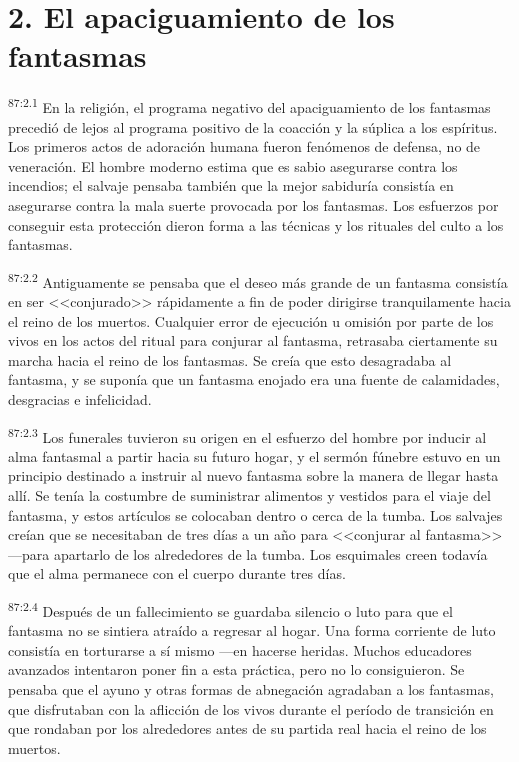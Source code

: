 \section*{2. El apaciguamiento de los fantasmas}
\par
\textsuperscript{87:2.1} En la religión, el programa negativo del apaciguamiento de los fantasmas precedió de lejos al programa positivo de la coacción y la súplica a los espíritus. Los primeros actos de adoración humana fueron fenómenos de defensa, no de veneración. El hombre moderno estima que es sabio asegurarse contra los incendios; el salvaje pensaba también que la mejor sabiduría consistía en asegurarse contra la mala suerte provocada por los fantasmas. Los esfuerzos por conseguir esta protección dieron forma a las técnicas y los rituales del culto a los fantasmas.

\par
\textsuperscript{87:2.2} Antiguamente se pensaba que el deseo más grande de un fantasma consistía en ser <<conjurado>> rápidamente a fin de poder dirigirse tranquilamente hacia el reino de los muertos. Cualquier error de ejecución u omisión por parte de los vivos en los actos del ritual para conjurar al fantasma, retrasaba ciertamente su marcha hacia el reino de los fantasmas. Se creía que esto desagradaba al fantasma, y se suponía que un fantasma enojado era una fuente de calamidades, desgracias e infelicidad.

\par
\textsuperscript{87:2.3} Los funerales tuvieron su origen en el esfuerzo del hombre por inducir al alma fantasmal a partir hacia su futuro hogar, y el sermón fúnebre estuvo en un principio destinado a instruir al nuevo fantasma sobre la manera de llegar hasta allí. Se tenía la costumbre de suministrar alimentos y vestidos para el viaje del fantasma, y estos artículos se colocaban dentro o cerca de la tumba. Los salvajes creían que se necesitaban de tres días a un año para <<conjurar al fantasma>> ---para apartarlo de los alrededores de la tumba. Los esquimales creen todavía que el alma permanece con el cuerpo durante tres días.

\par
\textsuperscript{87:2.4} Después de un fallecimiento se guardaba silencio o luto para que el fantasma no se sintiera atraído a regresar al hogar. Una forma corriente de luto consistía en torturarse a sí mismo ---en hacerse heridas. Muchos educadores avanzados intentaron poner fin a esta práctica, pero no lo consiguieron. Se pensaba que el ayuno y otras formas de abnegación agradaban a los fantasmas, que disfrutaban con la aflicción de los vivos durante el período de transición en que rondaban por los alrededores antes de su partida real hacia el reino de los muertos.

